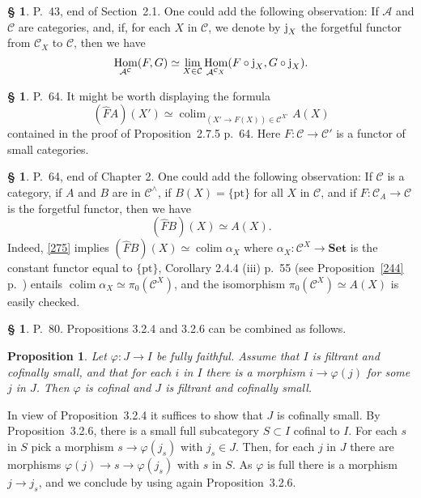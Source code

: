 \documentclass[12pt]{article}
\newtheorem{prop}[thm]{Proposition}
\theoremstyle{remark}
\theoremstyle{definition}
\newtheorem{cm}[thm]{\S}
\newcommand{\bc}{\begin{cm}}\newcommand{\ec}{\end{cm}}
\newcommand{\n}{\noindent}
\newcommand{\A}{\mathcal A}
\newcommand{\C}{\mathcal C}
\newcommand{\Set}{\textbf{Set}}
\newcommand{\p}{\varphi}
\newcommand{\be}{\begin{equation}}
\newcommand{\ee}{\end{equation}}
\newcommand{\pr}{Proposition}
\DeclareMathOperator*{\co}{colim}
\DeclareMathOperator{\h}{Hom}
\begin{document}

\bc P.~43, end of Section~2.1. One could add the following observation: If $\A$ and $\C$ are categories, and, if, for each $X$ in $\C$, we denote by $\text j_X$ the forgetful functor from $\C_X$ to $\C$, then we have 
\be\label{17115}
\h_{\A^\C}(F,G)\simeq\lim_{X\in\C}\h_{\A^{\C_X}}(F\circ\text j_X,G\circ\text j_X).
\ee
\ec 


\bc P.~64. It might be worth displaying the formula 
\be\label{275}
(\widehat FA)(X')\simeq\co_{(X'\to F(X))\in\C^{X'}}A(X)
\ee
contained in the proof of \pr\ 2.7.5 p.~64. Here $F:\C\to\C'$ is a functor of small categories. 
\ec 


\bc P.~64, end of Chapter 2. One could add the following observation: If $\C$ is a category, if $A$ and $B$ are in $\C^\wedge$, if $B(X)=\{\text{pt}\}$ for all $X$ in $\C$, and if $F:\C_A\to\C$ is the forgetful functor, then we have 
\be\label{1725}
(\widehat FB)(X)\simeq A(X).
\ee
Indeed, \eqref{275} implies $(\widehat FB)(X)\simeq\co\alpha_X$ where $\alpha_X:\C^X\to\Set$ is the constant functor equal to $\{\text{pt}\}$, Corollary 2.4.4 (iii) p.~55 (see Proposition~\ref{244} p.~\pageref{244}) entails $\co\alpha_X\simeq\pi_0(\C^X)$, and the isomorphism $\pi_0(\C^X)\simeq A(X)$ is easily checked.
\ec 


\bc P.~80. \pr s 3.2.4 and 3.2.6 can be combined as follows. 

\begin{prop}\label{comb} 
Let $\p:J\to I$ be fully faithful. Assume that $I$ is filtrant and cofinally small, and that for each $i$ in $I$ there is a morphism $i\to\p(j)$ for some $j$ in $J$. Then $\p$ is cofinal and $J$ is filtrant and cofinally small. 
\end{prop} 

\n{\em Proof.} In view of \pr\ 3.2.4 it suffices to show that $J$ is cofinally small. By \pr\ 3.2.6, there is a small full subcategory $S\subset I$ cofinal to $I$. For each $s$ in $S$ pick a morphism $s\to\p(j_s)$ with $j_s\in J$. Then, for each $j$ in $J$ there are morphisms $\p(j)\to s\to\p(j_s)$ with $s$ in $S$. As $\p$ is full there is a morphism $j\to j_s$, and we conclude by using again \pr\ 3.2.6.
\ec 

\end{document}
